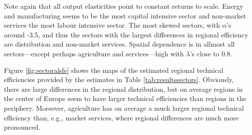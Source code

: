 \documentclass[11pt,parskip,abstracton,notitlepage]{scrartcl}
\begin{document}
%
Note again that all output elasticities point to constant returns to scale. Energy and manufacturing seems to be the most capital intensive sector and non-market services the most labour intensive sector. The most skewed sectors, with $\alpha$'s around -3.5, and thus the sectors with the largest differences in regional efficiency are distribution and non-market services. Spatial dependence is in allmost all sectors---except perhaps agriculture and services---high with $\lambda$'s close to 0.8.

Figure \ref{fig:sectoralsfe} shows the maps of the estimated regional technical efficiencies provided by the estimates in Table \ref{tab:resultssectors}. Obviously, there are large differences in the regional distribution, but on average regions in the center of Europe seem to have larger technical efficiencies than regions in the periphery. Moreover, agriculture has on average a much larger regional technical efficiency than, e.g., market services, where regional differences are much more pronounced. 
\end{document}
